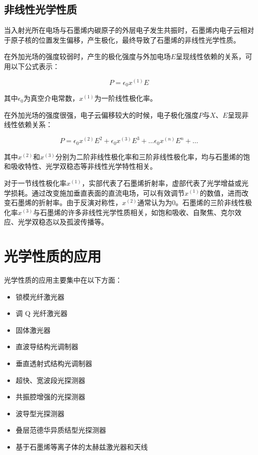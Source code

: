 \subsection{非线性光学性质}

当入射光所在电场与石墨烯内碳原子的外层电子发生共振时，石墨烯内电子云相对于原子核的位置发生偏移，产生极化，最终导致了石墨烯的非线性光学性质。

在外加光场的强度较弱时，产生的极化强度与外加电场$E$呈现线性依赖的关系，可用以下公式表示：

\begin{equation}
    P = \epsilon_0 x^{(1)}E
\end{equation}

其中$\epsilon_0$为真空介电常数，$x^{(1)}$为一阶线性极化率。

在外加光场的强度很强，电子云偏移较大的时候，电子极化强度$P$与$X$、$E$呈现非线性依赖关系：

\begin{equation}
    P = \epsilon_0 x^{(2)}E^2 + \epsilon_0 x^{(3)}E^3 + \ldots \epsilon_0 x^{(n)}E^n +\ldots
\end{equation}

其中$x^{(2)}$和$x^{(3)}$分别为二阶非线性极化率和三阶非线性极化率，均与石墨烯的饱和吸收特性、光学双稳态等非线性光学特性相关。

对于一节线性极化率$x^{(1)}$，实部代表了石墨烯折射率，虚部代表了光学增益或光学损耗。通过改变施加垂直表面的直流电场，可以有效调节$x^{(1)}$的数值，进而改变石墨烯的折射率。由于反演对称性，$x^{(2)}$通常认为为$0$。石墨烯的三阶非线性极化率$x^{(3)}$与石墨烯的许多非线性光学性质相关，如饱和吸收、自聚焦、克尔效应、光学双稳态以及孤波传播等。

\section{光学性质的应用}

光学性质的应用主要集中在以下方面：

\begin{itemize}
    \item 锁模光纤激光器
    \item 调 Q 光纤激光器
    \item 固体激光器
    \item 直波导结构光调制器
    \item 垂直透射式结构光调制器
    \item 超快、宽波段光探测器
    \item 共振腔增强的光探测器
    \item 波导型光探测器
    \item 叠层范德华异质结型光探测器
    \item 基于石墨烯等离子体的太赫兹激光器和天线
\end{itemize}